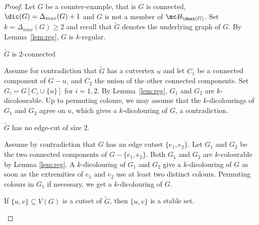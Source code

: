 \begin{proof}
Let $G$ be a counter-example, that is $G$ is connected, $\dic(G) = \Delta_{max}(G) +1$ and $G$ is not a member of $\mc B_{\dmax(G)}$. Set $k = \Delta_{max}(G) \geq 2$ and recall that $\tilde{G}$ denotes the underlying graph of $G$.
By Lemma~\ref{lem:reg}, $G$ is $k$-regular.


\begin{claim}\label{claim:2con}
 $\tilde{G}$ is $2$-connected
\end{claim}

\begin{proofclaim}
Assume for contradiction that $\tilde G$ has a cutvertex $u$ and let $C_1$ be a connected component of $G - u$, and $C_2$ the union of the other connected components.  
Set $G_{i} = G[C_{i} \cup \{u\}]$ for $i=1,2$. By Lemma~\ref{lem:reg}, $G_1$ and $G_2$ are $k$-dicolourable. 
Up to permuting colours, we may assume that the $k$-dicolourings of $G_1$ and $G_2$ agree on $u$, which gives a $k$-dicolouring of $G$, a contradiction. 
\end{proofclaim}

\begin{claim}\label{claim:2edgeCut}
  $\tilde G$ has no edge-cut of size $2$.
\end{claim}

\begin{proofclaim} 
Assume by contradiction that $G$ has an edge cutset $\{e_1, e_2\}$. 
Let $G_{1}$ and $G_2$ be the two connected components of $G - \{e_1, e_2\}$. 
Both $G_1$ and $G_2$ are $k$-colourable by Lemma \ref{lem:reg}. 
A $k$-dicolouring of $G_1$ and $G_2$ give a $k$-dicolouring of $G$ as soon as the extremities of $e_1$ and $e_2$ use at least two distinct colours. Permuting colours in $G_1$ if necessary, we get a $k$-dicolouring of $G$. 
\end{proofclaim}

\begin{claim}\label{claim:2cut}
If $\{u,v\} \subseteq V(G)$ is a cutset of $\tilde{G}$, then $\{u,v\}$ is a stable set. 
\end{claim}


\end{proof}
